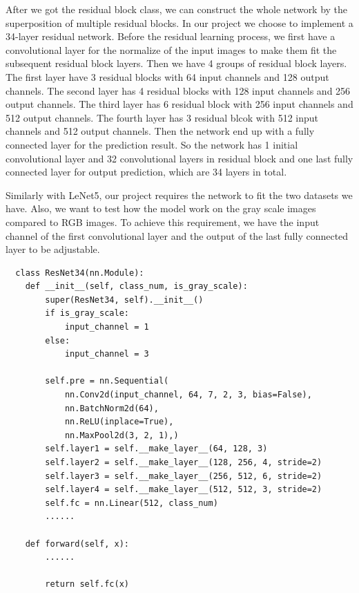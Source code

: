 \documentclass[12pt]{article}
\begin{document}
After we got the residual block class, we can construct the whole network by the superposition of multiple residual blocks. In our project we choose to implement a 34-layer residual network. Before the residual learning process, we first have a convolutional layer for the normalize of the input images to make them fit the subsequent residual block layers. Then we have 4 groups of residual block layers. The first layer have 3 residual blocks with 64 input channels and 128 output channels. The second layer has 4 residual blocks with 128 input channels and 256 output channels. The third layer has 6 residual block with 256 input channels and 512 output channels. The fourth layer has 3 residual blcok with 512 input channels and 512 output channels. Then the network end up with a fully connected layer for the prediction result. So the network has 1 initial convolutional layer and 32 convolutional layers in residual block and one last fully connected layer for output prediction, which are 34 layers in total.

Similarly with LeNet5, our project requires the network to fit the two datasets we have. Also, we want to test how the model work on the gray scale images compared to RGB images. To achieve this requirement, we have the input channel of the first convolutional layer and the output of the last fully connected layer to be adjustable. 

\begin{lstlisting}
  class ResNet34(nn.Module):
    def __init__(self, class_num, is_gray_scale):
        super(ResNet34, self).__init__()
        if is_gray_scale:
            input_channel = 1
        else:
            input_channel = 3

        self.pre = nn.Sequential(
            nn.Conv2d(input_channel, 64, 7, 2, 3, bias=False),
            nn.BatchNorm2d(64),
            nn.ReLU(inplace=True),
            nn.MaxPool2d(3, 2, 1),)
        self.layer1 = self.__make_layer__(64, 128, 3)
        self.layer2 = self.__make_layer__(128, 256, 4, stride=2)
        self.layer3 = self.__make_layer__(256, 512, 6, stride=2)
        self.layer4 = self.__make_layer__(512, 512, 3, stride=2)
        self.fc = nn.Linear(512, class_num)
        ......

    def forward(self, x):
        ......

        return self.fc(x)
\end{lstlisting}
\end{document}
